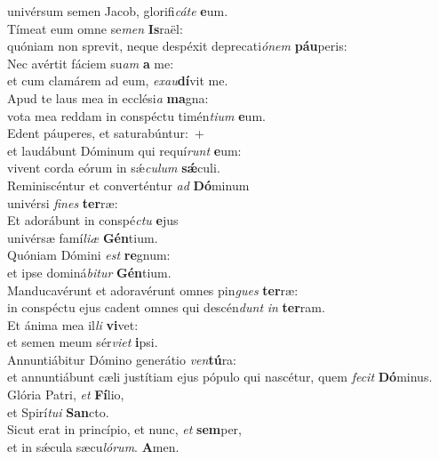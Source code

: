 \evenverse univérsum semen Jacob, glorifi\textit{cá}\textit{te} \textbf{e}um.\\
\oddverse Tímeat eum omne se\textit{men} \textbf{Is}raël:~\*\\
\oddverse quóniam non sprevit, neque despéxit deprecati\textit{ó}\textit{nem} \textbf{páu}peris:\\
\evenverse Nec avértit fáciem su\textit{am} \textbf{a} me:~\*\\
\evenverse et cum clamárem ad eum, \textit{e}\textit{xau}\textbf{dí}vit me.\\
\oddverse Apud te laus mea in ecclési\textit{a} \textbf{ma}gna:~\*\\
\oddverse vota mea reddam in conspéctu timén\textit{ti}\textit{um} \textbf{e}um.\\
\evenverse Edent páuperes, et saturabúntur:~+\\
\evenverse  et laudábunt Dóminum qui requí\textit{runt} \textbf{e}um:~\*\\
\evenverse vivent corda eórum in sǽ\textit{cu}\textit{lum} \textbf{sǽ}culi.\\
\oddverse Reminiscéntur et converténtur \textit{ad} \textbf{Dó}minum~\*\\
\oddverse univérsi \textit{fi}\textit{nes} \textbf{ter}ræ:\\
\evenverse Et adorábunt in conspé\textit{ctu} \textbf{e}jus~\*\\
\evenverse univérsæ famí\textit{li}\textit{æ} \textbf{Gén}tium.\\
\oddverse Quóniam Dómini \textit{est} \textbf{re}gnum:~\*\\
\oddverse et ipse dominá\textit{bi}\textit{tur} \textbf{Gén}tium.\\
\evenverse Manducavérunt et adoravérunt omnes pin\textit{gues} \textbf{ter}ræ:~\*\\
\evenverse in conspéctu ejus cadent omnes qui descén\textit{dunt} \textit{in} \textbf{ter}ram.\\
\oddverse Et ánima mea il\textit{li} \textbf{vi}vet:~\*\\
\oddverse et semen meum sér\textit{vi}\textit{et} \textbf{i}psi.\\
\evenverse Annuntiábitur Dómino generátio \textit{ven}\textbf{tú}ra:~\*\\
\evenverse et annuntiábunt cæli justítiam ejus pópulo qui nascétur, quem \textit{fe}\textit{cit} \textbf{Dó}minus.\\
\oddverse Glória Patri, \textit{et} \textbf{Fí}lio,~\*\\
\oddverse et Spirí\textit{tu}\textit{i} \textbf{San}cto.\\
\evenverse Sicut erat in princípio, et nunc, \textit{et} \textbf{sem}per,~\*\\
\evenverse et in sǽcula sæcu\textit{ló}\textit{rum}. \textbf{A}men.\\
